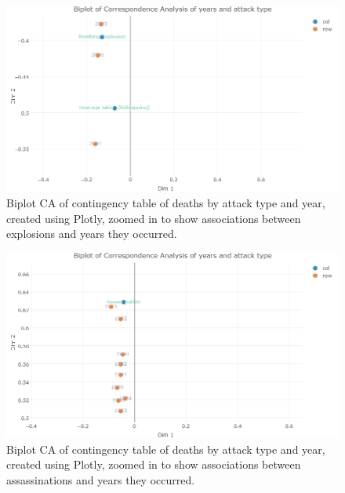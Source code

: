 \begin{figure}[t]
\includegraphics[width=15cm]{Peters_experiment_markdown_files/figure-latex/biplotexlosions.png}
\caption{Biplot CA of contingency table of deaths by attack type and year, created using Plotly, zoomed in to show associations between explosions  and years they occurred.}
\label{fig:biplotattacktypeca1}
\centering
\end{figure}
\begin{figure}[t]
\includegraphics[width=15cm]{Peters_experiment_markdown_files/figure-latex/assassinationbiplot.png}
\caption{Biplot CA of contingency table of deaths by attack type and year, created using Plotly, zoomed in to show associations between assassinations and years they occurred.}
\label{fig:biplotattacktypeca2}
\centering
\end{figure}

